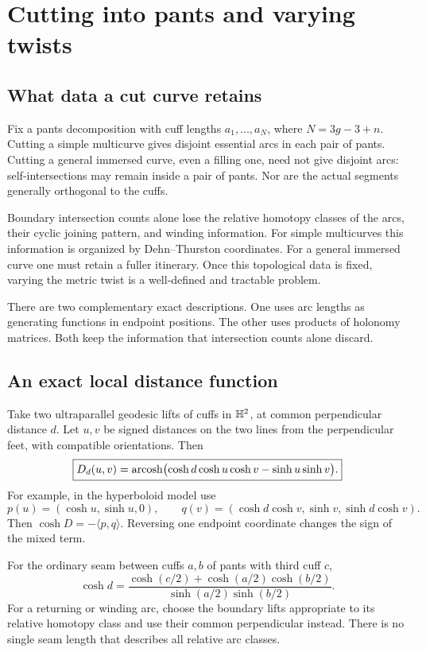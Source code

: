 \section{Cutting into pants and varying twists}
\label{sec:twists}

\subsection{What data a cut curve retains}

Fix a pants decomposition with cuff lengths $a_1,\ldots,a_N$, where
$N=3g-3+n$. Cutting a simple multicurve gives disjoint essential arcs in
each pair of pants. Cutting a general immersed curve, even a filling one,
need not give disjoint arcs: self-intersections may remain inside a pair
of pants. Nor are the actual segments generally orthogonal to the cuffs.

Boundary intersection counts alone lose the relative homotopy classes of
the arcs, their cyclic joining pattern, and winding information. For simple
multicurves this information is organized by Dehn--Thurston coordinates.
For a general immersed curve one must retain a fuller itinerary. Once this
topological data is fixed, varying the metric twist is a well-defined and
tractable problem.

There are two complementary exact descriptions. One uses arc lengths as
generating functions in endpoint positions. The other uses products of
holonomy matrices. Both keep the information that intersection counts alone
discard.

\subsection{An exact local distance function}

Take two ultraparallel geodesic lifts of cuffs in $\mathbb H^2$, at common
perpendicular distance $d$. Let $u,v$ be signed distances on the two lines
from the perpendicular feet, with compatible orientations. Then
\begin{equation}
 \boxed{
 D_d(u,v)=\operatorname{arcosh}\bigl(\cosh d\cosh u\cosh v-\sinh u\sinh v\bigr).}
 \label{eq:localdistance}
\end{equation}
For example, in the hyperboloid model use
\[
 p(u)=(\cosh u,\sinh u,0),\qquad
 q(v)=(\cosh d\cosh v,\sinh v,\sinh d\cosh v).
\]
Then $\cosh D=-\langle p,q\rangle$. Reversing one endpoint coordinate
changes the sign of the mixed term.

For the ordinary seam between cuffs $a,b$ of pants with third cuff $c$,
\begin{equation}
 \cosh d=\frac{\cosh(c/2)+\cosh(a/2)\cosh(b/2)}
                    {\sinh(a/2)\sinh(b/2)}.
 \label{eq:seam}
\end{equation}
For a returning or winding arc, choose the boundary lifts appropriate to
its relative homotopy class and use their common perpendicular instead.
There is no single seam length that describes all relative arc classes.

